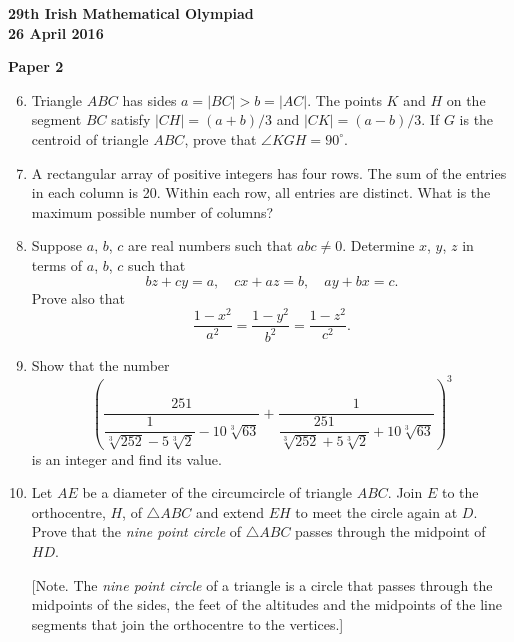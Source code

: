 \documentclass[12pt]{article}
\begin{document}
\newpage
\begin{center}
{\large\bfseries 29th Irish Mathematical Olympiad\\26 April 2016}
\end{center}
\bigskip\noindent\textbf{Paper 2}\bigskip
\begin{enumerate}
\setcounter{enumi}{5}
\item Triangle $ABC$ has sides $a = |BC| > b = |AC|$. The points $K$ and $H$ on the segment $BC$ satisfy $|CH| = (a+b)/3$ and $|CK| = (a-b)/3$. If $G$ is the centroid of triangle $ABC$, prove that $\angle KGH = 90^\circ$.

\item A rectangular array of positive integers has four rows. The sum of the entries in each column is 20. Within each row, all entries are distinct. What is the maximum possible number of columns?

\item Suppose $a$, $b$, $c$ are real numbers such that $abc \neq 0$. Determine $x$, $y$, $z$ in terms of $a$, $b$, $c$ such that
\[
bz + cy = a, \quad cx + az = b, \quad ay + bx = c.
\]
Prove also that
\[
\frac{1-x^2}{a^2} = \frac{1-y^2}{b^2} = \frac{1-z^2}{c^2}.
\]

\item Show that the number
\[
\left(\frac{251}{\dfrac{1}{\sqrt[3]{252} - 5\sqrt[3]{2}} - 10\sqrt[3]{63}} + \frac{1}{\dfrac{251}{\sqrt[3]{252} + 5\sqrt[3]{2}} + 10\sqrt[3]{63}}\right)^3
\]
is an integer and find its value.

\item Let $AE$ be a diameter of the circumcircle of triangle $ABC$. Join $E$ to the orthocentre, $H$, of $\triangle ABC$ and extend $EH$ to meet the circle again at $D$. Prove that the \emph{nine point circle} of $\triangle ABC$ passes through the midpoint of $HD$.

[Note. The \emph{nine point circle} of a triangle is a circle that passes through the midpoints of the sides, the feet of the altitudes and the midpoints of the line segments that join the orthocentre to the vertices.]
\end{enumerate}
\end{document}
